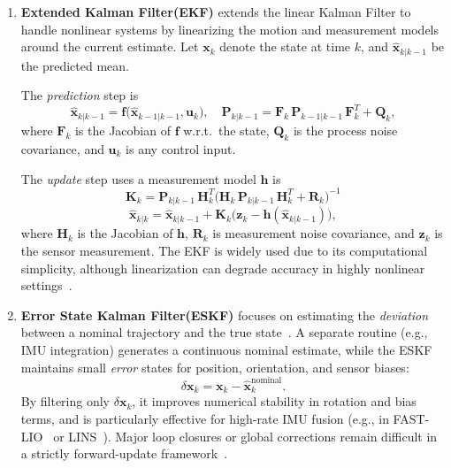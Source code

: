 \begin{enumerate}
    \item \textbf{Extended Kalman Filter(EKF) }extends the linear Kalman Filter \cite{kalman1960new} to handle nonlinear systems by linearizing the motion and measurement models around the current estimate.  Let $\mathbf{x}_k$ denote the state at time $k$, and 
    $\hat{\mathbf{x}}_{k|k-1}$ be the predicted mean. 
    
    The \emph{prediction} step is
        \begin{equation}
        \hat{\mathbf{x}}_{k|k-1} = \mathbf{f}\bigl(\hat{\mathbf{x}}_{k-1|k-1}, \mathbf{u}_{k}\bigr), \quad
        \mathbf{P}_{k|k-1} = \mathbf{F}_k \,\mathbf{P}_{k-1|k-1}\,\mathbf{F}_k^T + \mathbf{Q}_k,
        \end{equation}
        where $\mathbf{F}_k$ is the Jacobian of $\mathbf{f}$ w.r.t.\ the state, $\mathbf{Q}_k$ is the process noise covariance, and $\mathbf{u}_k$ is any control input. 
        
    The \emph{update} step uses a measurement model $\mathbf{h}$ is 
        \begin{equation}
        \mathbf{K}_k = \mathbf{P}_{k|k-1} \,\mathbf{H}_k^T 
        \bigl(\mathbf{H}_k\,\mathbf{P}_{k|k-1}\,\mathbf{H}_k^T + \mathbf{R}_k\bigr)^{-1}
        \end{equation}
        \begin{equation}
            \hat{\mathbf{x}}_{k|k} = \hat{\mathbf{x}}_{k|k-1} + \mathbf{K}_k 
            \bigl(\mathbf{z}_k - \mathbf{h}(\hat{\mathbf{x}}_{k|k-1})\bigr),
        \end{equation}
        where $\mathbf{H}_k$ is the Jacobian of $\mathbf{h}$, $\mathbf{R}_k$ is measurement noise covariance, and $\mathbf{z}_k$ is the sensor measurement. The EKF is widely used due to its computational simplicity, although linearization can degrade accuracy in highly nonlinear settings~\cite{thrun2005probabilistic}.
        
    \item \textbf{Error State Kalman Filter(ESKF)} focuses on estimating the \emph{deviation} between a nominal trajectory and the true state~\cite{mourikis2007multi}. A separate routine (e.g., IMU integration) generates a continuous nominal estimate, while the ESKF maintains small \emph{error} states for position, orientation, and sensor biases:
\begin{equation}
\delta \mathbf{x}_k = \mathbf{x}_k - \hat{\mathbf{x}}_{k}^{\text{nominal}}.
\end{equation}
By filtering only $\delta \mathbf{x}_k$, it improves numerical stability in rotation and bias terms, and is particularly effective for high-rate IMU fusion (e.g., in FAST-LIO~\cite{xuFastLIO2021} or LINS~\cite{lins}). Major loop closures or global corrections remain difficult in a strictly forward-update framework~\cite{cadena2016past}.


\end{enumerate}
